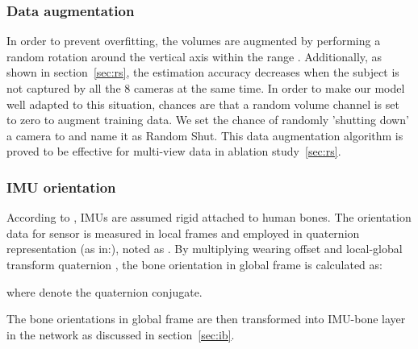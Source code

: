 \documentclass[10pt,twocolumn,letterpaper]{article}
\begin{document}
\subsubsection{Data augmentation}
In order to prevent overfitting, the volumes are augmented by performing a random rotation around the vertical axis within the range . Additionally, as shown in section~\ref{sec:rs}, the estimation accuracy decreases when the subject is not captured by all the 8 cameras at the same time. In order to make our model well adapted to this situation, chances are that a random volume channel is set to zero to augment training data. We set the chance of randomly 'shutting down' a camera to  and name it as Random Shut. This data augmentation algorithm is proved to be effective for multi-view data in ablation study~\ref{sec:rs}.
\vspace{-0.3cm}
\subsubsection{IMU orientation}
According to \cite{trumble2017total}, IMUs are assumed rigid attached to human bones. The orientation data for sensor  is measured in local frames and employed in quaternion representation (as in:\cite{gebre2004design,choukroun2003novel,bachmann1999orientation}), noted as . By multiplying wearing offset   and local-global transform quaternion  , the bone orientation in global frame   is calculated as:


where  denote the quaternion conjugate.

The bone orientations in global frame  are then transformed into IMU-bone layer in the network as discussed in section~\ref{sec:ib}.

\begin{table}
\begin{center}
\end{center}
\vspace{-0.3cm}
\caption{Comparison results regarding mean joint error on TotalCapture dataset. 
 indicates sequence-based work. See \S\ref{sec:tc_eval} for detail. (Best in \textbf{bold}; same for other tables).}
\vspace{-0.4cm}
\label{tab:final}
\end{table}
\end{document}
